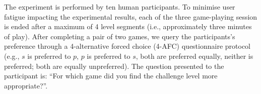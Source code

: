 \documentclass[letterpaper]{article}
\begin{document}

The experiment is performed by ten human participants. To minimise user fatigue impacting the experimental results, each of the three game-playing session is ended after a maximum of 4 level segments (i.e., approximately three minutes of play). After completing a pair of two games, we query the participants's preference through a 4-alternative forced choice (4-AFC) questionnaire protocol (e.g., $s$ is preferred to $p$, $p$ is preferred to $s$, both are preferred equally, neither is preferred; both are equally unpreferred). The question presented to the participant is: ``For which game did you find the challenge level more appropriate?''.
\end{document}
